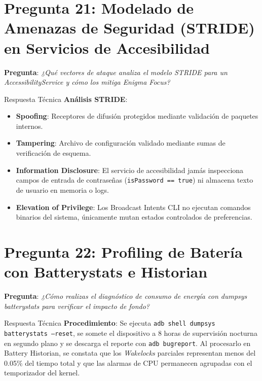 \documentclass[11pt,a4paper,oneside]{report}
\begin{document}
\section{Pregunta 21: Modelado de Amenazas de Seguridad (STRIDE) en Servicios de Accesibilidad}
\textbf{Pregunta}: \textit{¿Qué vectores de ataque analiza el modelo STRIDE para un AccessibilityService y cómo los mitiga Enigma Focus?}
\begin{starbox}{Respuesta Técnica}
\textbf{Análisis STRIDE}:
\begin{itemize}[noitemsep]
    \item \textbf{Spoofing}: Receptores de difusión protegidos mediante validación de paquetes internos.
    \item \textbf{Tampering}: Archivo de configuración validado mediante sumas de verificación de esquema.
    \item \textbf{Information Disclosure}: El servicio de accesibilidad jamás inspecciona campos de entrada de contraseñas (\texttt{isPassword == true}) ni almacena texto de usuario en memoria o logs.
    \item \textbf{Elevation of Privilege}: Los Broadcast Intents CLI no ejecutan comandos binarios del sistema, únicamente mutan estados controlados de preferencias.
\end{itemize}
\end{starbox}

\section{Pregunta 22: Profiling de Batería con Batterystats e Historian}
\textbf{Pregunta}: \textit{¿Cómo realizas el diagnóstico de consumo de energía con dumpsys batterystats para verificar el impacto de fondo?}
\begin{starbox}{Respuesta Técnica}
\textbf{Procedimiento}: Se ejecuta \texttt{adb shell dumpsys batterystats --reset}, se somete el dispositivo a 8 horas de supervisión nocturna en segundo plano y se descarga el reporte con \texttt{adb bugreport}. Al procesarlo en Battery Historian, se constata que los \textit{Wakelocks} parciales representan menos del 0.05\% del tiempo total y que las alarmas de CPU permanecen agrupadas con el temporizador del kernel.
\end{starbox}
\end{document}

